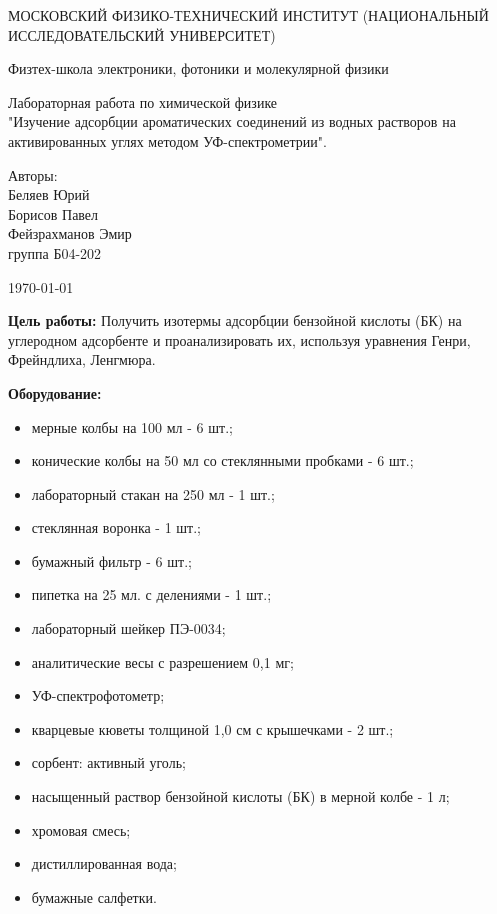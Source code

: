 \documentclass[a4paper,12pt]{article} %
\date{\today}
\begin{document}
\begin{titlepage}
	\begin{center}
		{\large МОСКОВСКИЙ ФИЗИКО-ТЕХНИЧЕСКИЙ ИНСТИТУТ (НАЦИОНАЛЬНЫЙ ИССЛЕДОВАТЕЛЬСКИЙ УНИВЕРСИТЕТ)}
	\end{center}
	\begin{center}
		{\large Физтех-школа электроники, фотоники и молекулярной физики}
	\end{center}
	
	
	\vspace{4.5cm}
	{\huge
		\begin{center}
			{Лабораторная работа по химической физике}\\
                {"Изучение адсорбции ароматических соединений из водных растворов на активированных углях методом УФ-спектрометрии".}\\
		\end{center}
	}
	\vspace{2cm}
	\begin{flushright}
		{\LARGE Авторы:\\ Беляев Юрий \\ Борисов Павел \\ Фейзрахманов Эмир  \\
			\vspace{0.2cm}
			группа Б04-202}
	\end{flushright}
	\vspace{7.5cm}
	\begin{center}
		\today
	\end{center}
\end{titlepage}

\textbf{Цель работы: }
Получить изотермы адсорбции бензойной кислоты (БК) на углеродном адсорбенте и проанализировать их, используя уравнения Генри, Фрейндлиха, Ленгмюра.
\par
\bigskip
\textbf{Оборудование: }
\begin{itemize}
    \item мерные колбы на 100 мл - 6 шт.;
    \item конические колбы на 50 мл со стеклянными пробками - 6 шт.;
    \item лабораторный стакан на 250 мл - 1 шт.;
    \item стеклянная воронка - 1 шт.;
    \item бумажный фильтр - 6 шт.;
    \item пипетка на 25 мл. с делениями - 1 шт.;
    \item лабораторный шейкер ПЭ-0034;
    \item аналитические весы с разрешением 0,1 мг;
    \item УФ-спектрофотометр;
    \item кварцевые кюветы толщиной 1,0 см с крышечками - 2 шт.;
    \item сорбент: активный уголь;
    \item насыщенный раствор бензойной кислоты (БК) в мерной колбе - 1 л;
    \item хромовая смесь;
    \item дистиллированная вода;
    \item бумажные салфетки.
\end{itemize}
\end{document}
